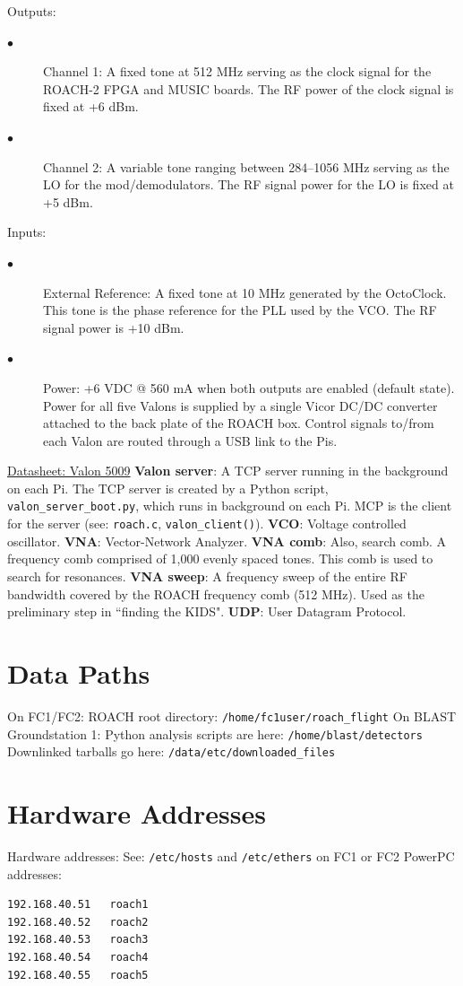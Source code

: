 Outputs:
\begin{description}
  \item[$\bullet$] Channel 1: A fixed tone at 512 MHz serving as the clock signal for the ROACH-2 FPGA and MUSIC boards. The RF power of the clock signal is fixed at +6 dBm.
  \item[$\bullet$] Channel 2: A variable tone ranging between 284--1056 MHz serving as the LO for the mod/demodulators. The RF signal power for the LO is fixed at +5 dBm.
\end{description}
Inputs:
\begin{description}
  \item[$\bullet$] External Reference: A fixed tone at 10 MHz generated by the OctoClock. This tone is the phase reference for the PLL used by the VCO. The RF signal power is +10 dBm.
  \item[$\bullet$] Power: +6 VDC @ 560 mA when both outputs are enabled (default state). Power for all five Valons is supplied by a single Vicor DC/DC converter attached to the back plate of the ROACH box. Control signals to/from each Valon are routed through a USB link to the Pis.
\end{description}
\href{https://www.valonrf.com/uploads/1/1/7/3/117370920/5009_datasheet_v1.34_20181113_ljr.pdf}{Datasheet: Valon 5009}
\textbf{Valon server}: A TCP server running in the background on each Pi. The TCP server is created by a Python script, \texttt{valon\_server\_boot.py}, which runs in background on each Pi. MCP is the client for the server (see: \texttt{roach.c}, \texttt{valon\_client()}).
\textbf{VCO}: Voltage controlled oscillator.
\textbf{VNA}: Vector-Network Analyzer.
\textbf{VNA comb}: Also, search comb. A frequency comb comprised of 1,000 evenly spaced tones. This comb is used to search for resonances.
\textbf{VNA sweep}: A frequency sweep of the entire RF bandwidth covered by the ROACH frequency comb (512 MHz). Used as the preliminary step in ``finding the KIDS".
\textbf{UDP}: User Datagram Protocol.

\section{Data Paths}
On FC1/FC2:
ROACH root directory: \texttt{/home/fc1user/roach\_flight}
On BLAST Groundstation 1:
Python analysis scripts are here: \texttt{/home/blast/detectors}
Downlinked tarballs go here: \texttt{/data/etc/downloaded\_files}

\section{Hardware Addresses}
Hardware addresses:
See: \texttt{/etc/hosts} and \texttt{/etc/ethers} on FC1 or FC2
PowerPC addresses:
\begin{verbatim}
192.168.40.51	roach1
192.168.40.52	roach2
192.168.40.53	roach3
192.168.40.54	roach4
192.168.40.55	roach5
\end{verbatim}

